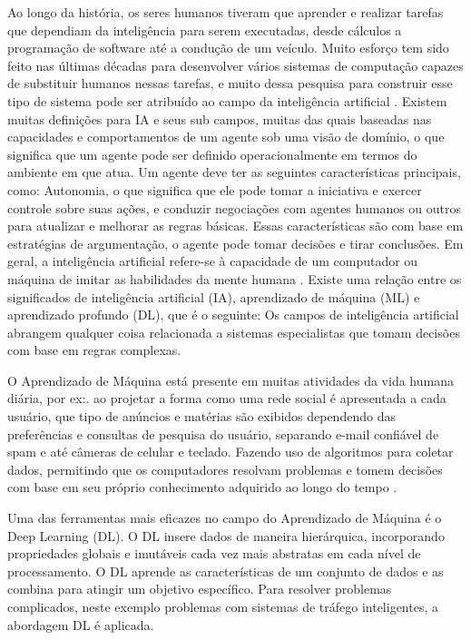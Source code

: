Ao longo da história, os seres humanos tiveram que aprender e realizar tarefas que dependiam da inteligência para serem executadas, desde cálculos a programação de software até a condução de um veículo. Muito esforço tem sido feito nas últimas décadas para desenvolver vários sistemas de computação capazes de substituir humanos nessas tarefas, e muito dessa pesquisa para construir esse tipo de sistema pode ser atribuído ao campo da inteligência artificial \cite{caio}. 
Existem muitas definições para IA e seus sub campos, muitas das quais baseadas nas capacidades e comportamentos de um agente sob uma visão de domínio, o que significa que um agente pode ser definido operacionalmente em termos do ambiente em que atua.
Um agente deve ter as seguintes características principais, como: Autonomia, o que significa que ele pode tomar a iniciativa e exercer controle sobre suas ações, e conduzir negociações com agentes humanos ou outros para atualizar e melhorar as regras básicas.
Essas características são com base em estratégias de argumentação, o agente pode tomar decisões e tirar conclusões. Em geral, a inteligência artificial refere-se à capacidade de um computador ou máquina de imitar as habilidades da mente humana \cite{software-ia}. Existe uma relação entre os significados de inteligência artificial (IA), aprendizado de máquina (ML) e aprendizado profundo (DL), que é o seguinte: Os campos de inteligência artificial abrangem qualquer coisa relacionada a sistemas especialistas que tomam decisões com base em regras complexas.


O Aprendizado de Máquina está presente em muitas atividades da vida humana diária, por ex:. ao projetar a forma como uma rede social é apresentada a cada usuário, que tipo de anúncios e matérias são exibidos dependendo das preferências e consultas de pesquisa do usuário, separando e-mail confiável de spam e até câmeras de celular e teclado. Fazendo uso de algoritmos para coletar dados, permitindo que os computadores resolvam problemas e tomem decisões com base em seu próprio conhecimento adquirido ao longo do tempo \cite{caio}.


Uma das ferramentas mais eficazes no campo do Aprendizado de Máquina é o Deep Learning (DL). O DL insere dados de maneira hierárquica, incorporando propriedades globais e imutáveis cada vez mais abstratas em cada nível de processamento. O DL aprende as características de um conjunto de dados e as combina para atingir um objetivo específico. Para resolver problemas complicados, neste exemplo problemas com sistemas de tráfego inteligentes, a abordagem DL é aplicada. 

